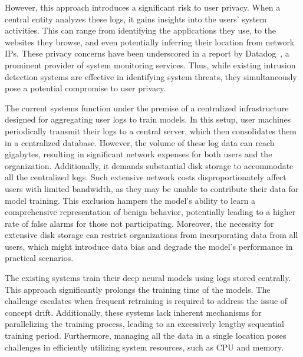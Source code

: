 However, this approach introduces a significant risk to user privacy. When a central entity analyzes these logs, it gains insights into the users' system activities. This can range from identifying the applications they use, to the websites they browse, and even potentially inferring their location from network IPs. These privacy concerns have been underscored in a report by Datadog~\cite{datadog}, a prominent provider of system monitoring services. Thus, while existing intrusion detection systems are effective in identifying system threats, they simultaneously pose a potential compromise to user privacy.

 The current systems function under the premise of a centralized infrastructure designed for aggregating user logs to train models. In this setup, user machines periodically transmit their logs to a central server, which then consolidates them in a centralized database. However, the volume of these log data can reach gigabytes, resulting in significant network expenses for both users and the organization. Additionally, it demands substantial disk storage to accommodate all the centralized logs. Such extensive network costs disproportionately affect users with limited bandwidth, as they may be unable to contribute their data for model training. This exclusion hampers the model's ability to learn a comprehensive representation of benign behavior, potentially leading to a higher rate of false alarms for those not participating. Moreover, the necessity for extensive disk storage can restrict organizations from incorporating data from all users, which might introduce data bias and degrade the model's performance in practical scenarios. 

 The existing systems train their deep neural models using logs stored centrally. This approach significantly prolongs the training time of the models. The challenge escalates when frequent retraining is required to address the issue of concept drift\Fix{~\cite{}}. Additionally, these systems lack inherent mechanisms for parallelizing the training process, leading to an excessively lengthy sequential training period\Fix{~\cite{}}. Furthermore, managing all the data in a single location poses challenges in efficiently utilizing system resources, such as CPU and memory.

